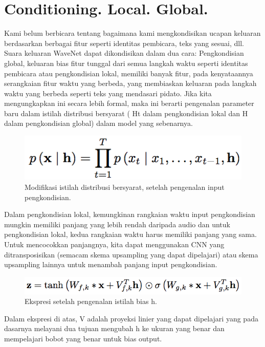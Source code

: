 \section{Conditioning. Local. Global.}
Kami belum berbicara tentang bagaimana kami mengkondisikan ucapan keluaran berdasarkan berbagai fitur seperti identitas pembicara, teks yang sesuai, dll. Suara keluaran WaveNet dapat dikondisikan dalam dua cara: Pengkondisian global, keluaran bias fitur tunggal dari semua langkah waktu seperti identitas pembicara atau pengkondisian lokal, memiliki banyak fitur, pada kenyataannya serangkaian fitur waktu yang berbeda, yang membiaskan keluaran pada langkah waktu yang berbeda seperti teks yang mendasari pidato. Jika kita mengungkapkan ini secara lebih formal, maka ini berarti pengenalan parameter baru dalam istilah distribusi bersyarat ( Ht dalam pengkondisian lokal dan H dalam pengkondisian global) dalam model yang sebenarnya.
\begin{figure}[H]
        \centerline{\includegraphics[scale=.5]{figures/rumus7}}
        \caption{Modifikasi istilah distribusi bersyarat, setelah pengenalan input pengkondisian.}
		\label{rumus7}
\end{figure}
Dalam pengkondisian lokal, kemungkinan rangkaian waktu input pengkondisian mungkin memiliki panjang yang lebih rendah daripada audio dan untuk pengkondisian lokal, kedua rangkaian waktu harus memiliki panjang yang sama. Untuk mencocokkan panjangnya, kita dapat menggunakan CNN yang ditransposisikan (semacam skema upsampling yang dapat dipelajari) atau skema upsampling lainnya untuk menambah panjang input pengkondisian.
\begin{figure}[H]
        \centerline{\includegraphics[scale=.5]{figures/rumus8}}
        \caption{Ekspresi setelah pengenalan istilah bias h.}
		\label{rumus8}
\end{figure}
Dalam ekspresi di atas, V adalah proyeksi linier yang dapat dipelajari yang pada dasarnya melayani dua tujuan mengubah h ke ukuran yang benar dan mempelajari bobot yang benar untuk bias output.

